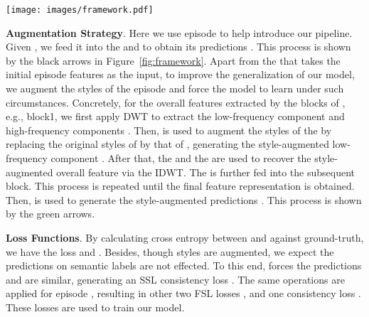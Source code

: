 \documentclass{article}
\begin{document}
	\begin{figure*}[t!]
		\centering
{\texttt{[image: images/framework.pdf]}}
		\vspace{-0.1in}
		\caption{\textbf{Overview of our wave-SAN network.} In the network, a dual-episode sampling mechanism is adopted. For each episode, two predictions are generated. One is obtained by directly feeding the episode into the feature extractor and FSL classifier (black arrows), while the other one is obtained by taking the style-augmented features as input (green or orange arrows). The style augmentation is implemented by the proposed StyleAug module which exchanges the styles of two low-frequency components decomposed by wavelet transform. Then an SSL module is introduced for keeping these two predictions similar.}
		\label{fig:framework} \vspace{-0.15in}
	\end{figure*}	

\noindent\textbf{Augmentation Strategy}.
Here we use episode  to help introduce our pipeline. Given , we feed it into the  and  to obtain its predictions . This process is shown by the black arrows in Figure~\ref{fig:framework}. Apart from the  that takes the initial episode features as the input, to improve the generalization of our model, we augment the styles of the episode and force the model to learn under such circumstances. Concretely, for the overall features  extracted by the blocks of , e.g., block1, we first apply DWT to extract the low-frequency component  and high-frequency components . Then,  is used to augment the styles of the  by replacing the original styles of  by that of , generating the style-augmented low-frequency component . After that, the  and the  are used to recover the style-augmented overall feature  via the IDWT. The  is further fed into the subsequent block. This process is repeated until the final feature representation is obtained. Then,  is used to generate the style-augmented predictions . This process is shown by the green arrows. 


\noindent\textbf{Loss Functions}.
By calculating  cross entropy  between   and  against  ground-truth, we have the loss  and .
Besides, though styles are augmented, we expect the predictions on  semantic labels are not effected. To this end,  forces the predictions  and  are similar, generating an SSL consistency loss . The same operations are applied for episode , resulting in other two FSL losses ,   and one consistency loss . These losses are used to train our model. 
\end{document}
